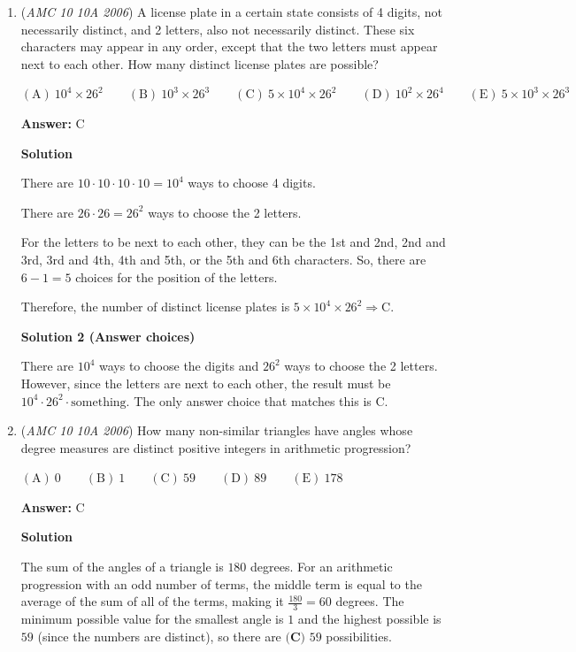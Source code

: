 \begin{enumerate}
 


	\item (\textit{AMC 10 10A 2006}) A license plate in a certain state consists of 4 digits, not necessarily distinct, and 2 letters, also not necessarily distinct. These six characters may appear in any order, except that the two letters must appear next to each other. How many distinct license plates are possible? 


 $\mathrm{(A)}\ 10^4\times26^2\qquad\mathrm{(B)}\ 10^3\times26^3\qquad\mathrm{(C)}\ 5\times10^4\times26^2\qquad\mathrm{(D)}\ 10^2\times26^4\qquad\mathrm{(E)}\ 5\times10^3\times26^3$

 \textbf{Answer: }C



\textbf{Solution}

There are $10\cdot10\cdot10\cdot10 = 10^4$ ways to choose 4 digits.

 There are $26 \cdot 26 = 26^2$ ways to choose the 2 letters. 

 For the letters to be next to each other, they can be the 1st and 2nd, 2nd and 3rd, 3rd and 4th, 4th and 5th, or the 5th and 6th characters. So, there are $6 - 1 = 5$ choices for the position of the letters.

 Therefore, the number of distinct license plates is  $5\times 10^4\times 26^2 \Longrightarrow \boxed{\mathrm{C}}$.

 



\textbf{Solution 2 (Answer choices)}

There are $10^4$ ways to choose the digits and $26^2$ ways to choose the 2 letters. However, since the letters are next to each other, the result must be $10^4\cdot 26^2 \cdot \text{something}$. The only answer choice that matches this is $\boxed{\mathrm{C}}$.

 


	\item (\textit{AMC 10 10A 2006}) How many non-similar triangles have angles whose degree measures are distinct positive integers in arithmetic progression? 


 $\mathrm{(A)}\ 0\qquad\mathrm{(B)}\ 1\qquad\mathrm{(C)}\ 59\qquad\mathrm{(D)}\ 89\qquad\mathrm{(E)}\ 178$

 \textbf{Answer: }C



\textbf{Solution}

The sum of the angles of a triangle is $180$ degrees. For an arithmetic progression with an odd number of terms, the middle term is equal to the average of the sum of all of the terms, making it $\frac{180}{3} = 60$ degrees. The minimum possible value for the smallest angle is $1$ and the highest possible is $59$ (since the numbers are distinct), so there are $\boxed{\textbf{(C) }59}$ possibilities.


\end{enumerate}
